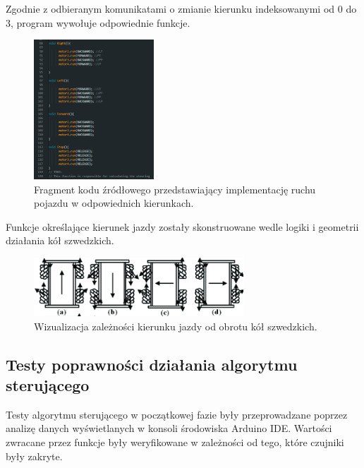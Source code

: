 \documentclass{report}
\begin{document}
Zgodnie z odbieranym komunikatami o zmianie kierunku indeksowanymi od 0 do 3, program wywołuje odpowiednie funkcje. 

\begin{figure}[H]
    \centering
    \includegraphics*[width=0.4\textwidth]{"src/code_snaps/movement_implementation.png"}
    \caption{Fragment kodu źródłowego przedstawiający implementację ruchu pojazdu w odpowiednich kierunkach.}
    \label{fig:sensor_init}
\end{figure}

Funkcje określające kierunek jazdy zostały skonstruowane wedle logiki i geometrii działania kół szwedzkich.

\begin{figure}[H]
    \centering
    \includegraphics*[width=0.7\textwidth]{"src/Robot_pics/Movement.png"}
    \caption{Wizualizacja zależności kierunku jazdy od obrotu kół szwedzkich.}
    \label{fig:sensor_init}
\end{figure}

\subsection{\Large Testy poprawności działania algorytmu sterującego}

%
%

Testy algorytmu sterującego w początkowej fazie były przeprowadzane poprzez analizę danych wyświetlanych w konsoli środowiska Arduino IDE. Wartości zwracane przez funkcje były weryfikowane w zależności od tego, które czujniki były zakryte.
\end{document}

